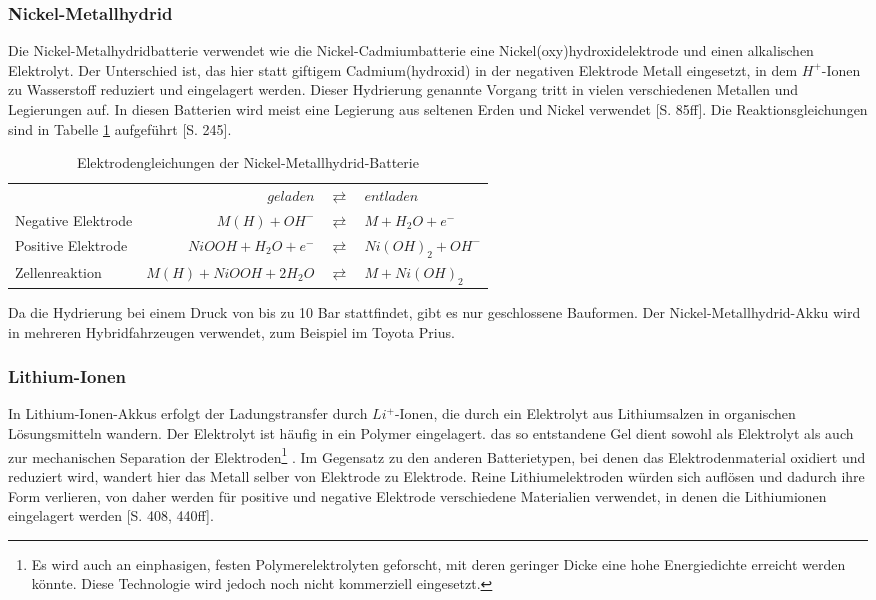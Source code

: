 \subsubsection{Nickel-Metallhydrid}
Die Nickel-Metalhydridbatterie verwendet wie die Nickel-Cadmiumbatterie eine Nickel(oxy)hydroxidelektrode und einen alkalischen Elektrolyt. Der Unterschied ist, das hier statt giftigem Cadmium(hydroxid) in der negativen Elektrode Metall eingesetzt, in dem $H^+$-Ionen zu Wasserstoff reduziert und eingelagert werden. Dieser Hydrierung genannte Vorgang tritt in vielen verschiedenen Metallen und Legierungen auf. In diesen Batterien wird meist eine Legierung aus seltenen Erden und Nickel verwendet \cite{KiehneBattery}[S. 85ff]. Die Reaktionsgleichungen sind in Tabelle \ref{NiMH} aufgeführt \cite{Sterner:2014}[S. 245].

\begin{table}\centering %
	\begin{tabularx}{\linewidth}{XrcX}
		&              $geladen$ & $\rightleftarrows$ & $entladen$        \\
		Negative Elektrode &          $M(H) + OH^-$ & $\rightleftarrows$ & $M + H_2O + e^-$  \\
		Positive Elektrode &   $NiOOH + H_2O + e^-$ & $\rightleftarrows$ & $Ni(OH)_2 + OH^-$ \\ \midrule
		Zellenreaktion     & $M(H) + NiOOH + 2H_2O$ & $\rightleftarrows$ & $M + Ni(OH)_2$    \\
	\end{tabularx}
	\caption{Elektrodengleichungen der Nickel-Metallhydrid-Batterie}
	\label{NiMH}
\end{table}

Da die Hydrierung bei einem Druck von bis zu 10 Bar stattfindet, gibt es nur geschlossene Bauformen. Der Nickel-Metallhydrid-Akku wird in mehreren Hybridfahrzeugen verwendet, zum Beispiel im Toyota Prius. 

\subsubsection{Lithium-Ionen}
In Lithium-Ionen-Akkus erfolgt der Ladungstransfer durch $Li^+$-Ionen, die durch ein Elektrolyt aus Lithiumsalzen in organischen Lösungsmitteln wandern. Der Elektrolyt ist häufig in ein Polymer eingelagert. das so entstandene Gel dient sowohl als Elektrolyt als auch zur mechanischen Separation der Elektroden\footnote{Es wird auch an einphasigen, festen Polymerelektrolyten geforscht, mit deren geringer Dicke eine hohe Energiedichte erreicht werden könnte. Diese Technologie wird jedoch noch nicht kommerziell eingesetzt.} \cite{xu2004nonaqueous}. Im Gegensatz zu den anderen Batterietypen, bei denen das Elektrodenmaterial oxidiert und reduziert wird, wandert hier das Metall selber von Elektrode zu Elektrode. Reine Lithiumelektroden würden sich auflösen und dadurch ihre Form verlieren, von daher werden für positive und negative Elektrode verschiedene Materialien verwendet, in denen die Lithiumionen eingelagert werden \cite{KiehneBattery}[S. 408, 440ff]. 

